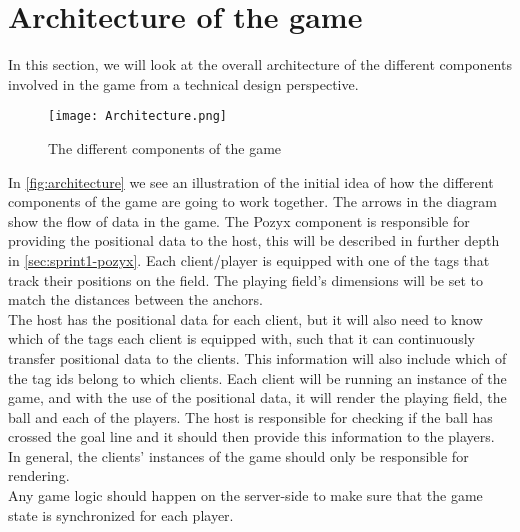 \section{Architecture of the game}\label{sec:sprint1-architecture}
In this section, we will look at the overall architecture of the different components involved in the game from a technical design perspective.
\begin{figure}[H]
    \centering
    \texttt{[image: Architecture.png]}
    \caption{The different components of the game}
    \label{fig:architecture}
\end{figure}
\noindent
In \autoref{fig:architecture} we see an illustration of the initial idea of how the different components of the game are going to work together.
The arrows in the diagram show the flow of data in the game.
The Pozyx component is responsible for providing the positional data to the host, this will be described in further depth in \autoref{sec:sprint1-pozyx}.
Each client/player is equipped with one of the tags that track their positions on the field. 
The playing field's dimensions will be set to match the distances between the anchors. \\
The host has the positional data for each client, but it will also need to know which of the tags each client is equipped with, such that it can continuously transfer positional data to the clients.
This information will also include which of the tag ids belong to which clients.
Each client will be running an instance of the game, and with the use of the positional data, it will render the playing field, the ball and each of the players.
The host is responsible for checking if the ball has crossed the goal line and it should then provide this information to the players.
In general, the clients' instances of the game should only be responsible for rendering. \\
Any game logic should happen on the server-side to make sure that the game state is synchronized for each player. 
